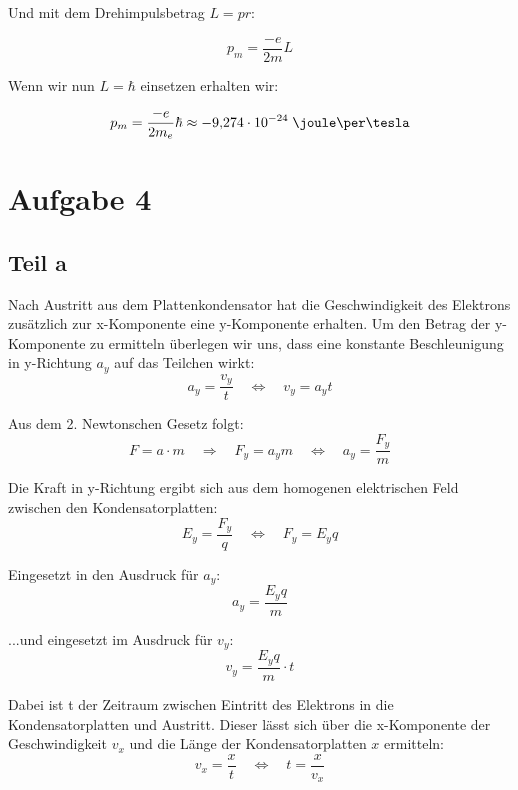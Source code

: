 \documentclass[a4paper,german,12pt,smallheadings]{scrartcl}
\begin{document}
Und mit dem Drehimpulsbetrag $L = pr$:

\begin{equation}
  p_m = \frac{-e}{2m} L
\end{equation}

Wenn wir nun $L = \hbar$ einsetzen erhalten wir:

\begin{equation}
  p_m = \frac{-e}{2m_e} \hbar \approx -9{,}274 \cdot 10^{-24} \;\joule\per\tesla
\end{equation}

\section*{Aufgabe 4}
\subsection*{Teil a}

Nach Austritt aus dem Plattenkondensator hat die Geschwindigkeit des Elektrons zusätzlich zur x-Komponente eine y-Komponente erhalten. Um den Betrag der y-Komponente zu ermitteln überlegen wir uns, dass eine konstante Beschleunigung in y-Richtung $a_y$ auf das Teilchen wirkt:
\begin{equation*}
a_y=\frac{v_y}{t} \quad \Leftrightarrow \quad v_y=a_yt
\end{equation*}

Aus dem 2. Newtonschen Gesetz folgt:
\begin{equation*}
F=a \cdot m \quad \Rightarrow \quad F_y=a_ym \quad \Leftrightarrow \quad a_y=\frac{F_y}{m}
\end{equation*}

Die Kraft in y-Richtung ergibt sich aus dem homogenen elektrischen Feld zwischen den Kondensatorplatten:
\begin{equation*}
E_y=\frac{F_y}{q} \quad \Leftrightarrow \quad F_y=E_yq
\end{equation*}

Eingesetzt in den Ausdruck für $a_y$:
\begin{equation*}
a_y=\frac{E_yq}{m}
\end{equation*}

...und eingesetzt im Ausdruck für $v_y$:
\begin{equation*}
v_y=\frac{E_yq}{m} \cdot t
\end{equation*}

Dabei ist t der Zeitraum zwischen Eintritt des Elektrons in die Kondensatorplatten und Austritt.  Dieser lässt sich über die x-Komponente der Geschwindigkeit $v_x$ und die Länge der Kondensatorplatten $x$ ermitteln:
\begin{equation*}
v_x=\frac{x}{t} \quad \Leftrightarrow \quad t=\frac{x}{v_x}
\end{equation*}
\end{document}
